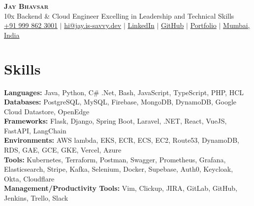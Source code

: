 \documentclass[letterpaper,11pt]{article}
\newcommand{\resumeSubHeadingListStart}{\begin{itemize}[leftmargin=0.15in, label={}]}
\newcommand{\resumeSubHeadingListEnd}{\end{itemize}}
\begin{document}

\begin{center}
  \textbf{\Huge \scshape Jay Bhavsar} \\ \vspace{3pt}
  \normalsize 10x Backend \& Cloud Engineer Excelling in Leadership and Technical Skills \\ \vspace{3pt}
  \small
  \faMobile \hspace{.5pt} \href{tel:919998623001}{+91 999 862 3001}
  $|$
  \faAt \hspace{.5pt} \href{mailto:hi@jay.is-savvy.dev}{hi@jay.is-savvy.dev}
  $|$
  \faLinkedinSquare \hspace{.5pt} \href{https://www.linkedin.com/in/jbhv12/}{LinkedIn}
  $|$
  \faGithub \hspace{.5pt} \href{https://github.com/jbhv12}{GitHub}
  $|$
  \faGlobe \hspace{.5pt} \href{https://jay.is-savvy.dev/}{Portfolio}
  $|$
  \faMapMarker \hspace{.5pt} \href{https://goo.gl/maps/Czh1vXePukiKumpu5}{Mumbai, India}
\end{center}


\section{Skills}
\vspace{2pt}
\resumeSubHeadingListStart
\small{\item{
              \textbf{Languages:}{ Java, Python, C\# .Net, Bash, JavaScript, TypeScript, PHP, HCL} \\ \vspace{3pt}
              \textbf{Databases:}{ PostgreSQL, MySQL, Firebase, MongoDB, DynamoDB, Google Cloud Datastore, OpenEdge} \\ \vspace{3pt}
              \textbf{Frameworks:}{ Flask, Django, Spring Boot, Laravel, .NET, React, VueJS, FastAPI, LangChain} \\ \vspace{3pt}
              \textbf{Environments:}{ AWS lambda, EKS, ECR, ECS, EC2, Route53, DynamoDB, RDS, GAE, GCE, GKE, Vercel, Azure} \\ \vspace{3pt}
              \textbf{Tools:}{ Kubernetes, Terraform, Postman, Swagger, Prometheus, Grafana, Elasticsearch, Stripe, Kafka, Selenium, Docker, Supebase, Auth0, Keycloak, Okta, Cloudflare} \\ \vspace{3pt}
              \textbf{Management/Productivity Tools:}{ Vim, Clickup, JIRA, GitLab, GitHub, Jenkins, Trello, Slack} \\ \vspace{3pt}
        }}
\resumeSubHeadingListEnd
\end{document}
